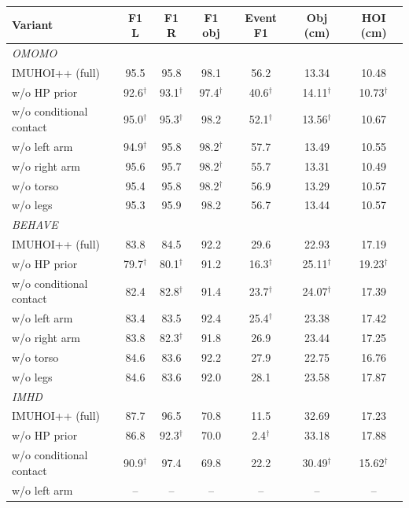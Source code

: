 \begin{table}[t]
\centering
\small
\setlength{\tabcolsep}{4pt}
\begin{tabular}{lcccccc}
\toprule
Variant & F1 L & F1 R & F1 obj & Event F1 & Obj (cm) & HOI (cm) \\
\midrule
\multicolumn{7}{l}{\textit{OMOMO}} \\
IMUHOI++ (full) & 95.5 & 95.8 & 98.1 & 56.2 & 13.34 & 10.48 \\
w/o HP prior & 92.6$^\dagger$ & 93.1$^\dagger$ & 97.4$^\dagger$ & 40.6$^\dagger$ & 14.11$^\dagger$ & 10.73$^\dagger$ \\
w/o conditional contact & 95.0$^\dagger$ & 95.3$^\dagger$ & 98.2 & 52.1$^\dagger$ & 13.56$^\dagger$ & 10.67 \\
w/o left arm & 94.9$^\dagger$ & 95.8 & 98.2$^\dagger$ & 57.7 & 13.49 & 10.55 \\
w/o right arm & 95.6 & 95.7 & 98.2$^\dagger$ & 55.7 & 13.31 & 10.49 \\
w/o torso & 95.4 & 95.8 & 98.2$^\dagger$ & 56.9 & 13.29 & 10.57 \\
w/o legs & 95.3 & 95.9 & 98.2 & 56.7 & 13.44 & 10.57 \\
\midrule
\multicolumn{7}{l}{\textit{BEHAVE}} \\
IMUHOI++ (full) & 83.8 & 84.5 & 92.2 & 29.6 & 22.93 & 17.19 \\
w/o HP prior & 79.7$^\dagger$ & 80.1$^\dagger$ & 91.2 & 16.3$^\dagger$ & 25.11$^\dagger$ & 19.23$^\dagger$ \\
w/o conditional contact & 82.4 & 82.8$^\dagger$ & 91.4 & 23.7$^\dagger$ & 24.07$^\dagger$ & 17.39 \\
w/o left arm & 83.4 & 83.5 & 92.4 & 25.4$^\dagger$ & 23.38 & 17.42 \\
w/o right arm & 83.8 & 82.3$^\dagger$ & 91.8 & 26.9 & 23.44 & 17.25 \\
w/o torso & 84.6 & 83.6 & 92.2 & 27.9 & 22.75 & 16.76 \\
w/o legs & 84.6 & 83.6 & 92.0 & 28.1 & 23.58 & 17.87 \\
\midrule
\multicolumn{7}{l}{\textit{IMHD}} \\
IMUHOI++ (full) & 87.7 & 96.5 & 70.8 & 11.5 & 32.69 & 17.23 \\
w/o HP prior & 86.8 & 92.3$^\dagger$ & 70.0 & 2.4$^\dagger$ & 33.18 & 17.88 \\
w/o conditional contact & 90.9$^\dagger$ & 97.4 & 69.8 & 22.2 & 30.49$^\dagger$ & 15.62$^\dagger$ \\
w/o left arm & -- & -- & -- & -- & -- & -- \\

\end{tabular}
\end{table}
